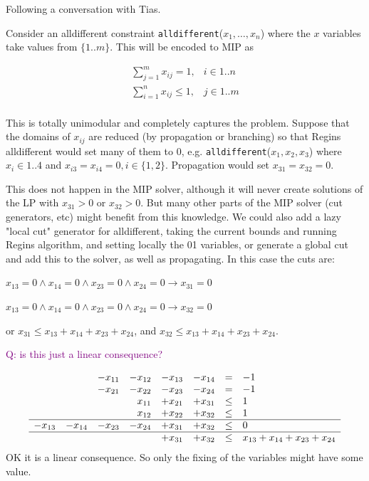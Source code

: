 \documentclass{article}
\newcommand{\question}[1]{\textcolor{purple}{\textsc{Q:} #1}}
\begin{document}
Following a conversation with Tias.

Consider an alldifferent constraint 
\texttt{alldifferent}($x_1, \ldots, x_n$) where the $x$ variables take values from $\{1..m\}$. This will be encoded to MIP as

\begin{eqnarray*}
\sum_{j=1}^m x_{ij} = 1, & i \in 1..n \\
\sum_{i=1}^n x_{ij} \leq 1, & j \in 1..m \\
\end{eqnarray*}

\noindent
This is totally unimodular and completely captures the problem.
Suppose that the domains of $x_{ij}$ are
reduced (by propagation or branching) so that Regins alldifferent would set many of them to 0, e.g. 
\texttt{alldifferent}($x_1,x_2,x_3$) 
where $x_i \in 1..4$ and
$x_{i3} = x_{i4} = 0, i \in \{1,2\}$.
Propagation would set
$x_{31} = x_{32} = 0$. 

This does not happen in the MIP solver, although it will never create solutions of the LP with $x_{31} > 0$ or $x_{32} > 0$.  But many other parts of the MIP solver (cut generators, etc) might benefit from this knowledge. 
We could also add a lazy "local cut" generator for alldifferent, taking the current bounds and running Regins algorithm, and setting locally the 
01 variables, or generate a global cut and add this to the solver, as well as propagating. In this case the cuts are:


$x_{13} = 0 \wedge x_{14}  = 0 \wedge x_{23} = 0 \wedge x_{24} = 0 \rightarrow x_{31} = 0$


$x_{13} = 0 \wedge x_{14}  = 0 \wedge x_{23} = 0 \wedge x_{24} = 0 \rightarrow x_{32} = 0$

or
$x_{31} \leq x_{13} + x_{14} + x_{23} + x_{24}$, and
$x_{32} \leq x_{13} + x_{14} + x_{23} + x_{24}$.

\question{is this just a linear consequence?}


$$
\begin{array}{rrrrrcrl}
&& - x_{11} & -x_{12} & - x_{13} & - x_{14} & = & -1 \\
&& - x_{21} & -x_{22} & - x_{23} & - x_{24} & = & -1 \\
&&&x_{11} & + x_{21} & + x_{31} & \leq & 1 \\
&&&x_{12} & + x_{22} & + x_{32} & \leq & 1 \\
\hline
-x_{13} & - x_{14} & - x_{23} & - x_{24} & + x_{31} & + x_{32} & \leq & 0  \\
\hline
&&&& + x_{31} & + x_{32} & \leq & x_{13}  + x_{14}  + x_{23}  + x_{24}  
\end{array}
$$
OK it is a linear consequence.
So only the fixing of the variables might have some value.









\end{document}
